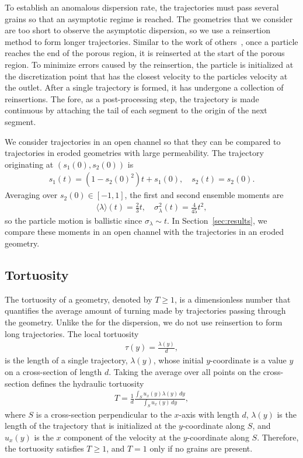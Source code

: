 \documentclass[preprint, 10pt]{elsarticle}
\begin{document}
To establish an anomalous dispersion rate, the trajectories must pass
several grains so that an asymptotic regime is reached. The geometries
that we consider are too short to observe the asymptotic dispersion, so
we use a reinsertion method to form longer trajectories. Similar to the
work of others~\cite{dea-qua-bir-jua2018, puy-gou-den2019}, once a
particle reaches the end of the porous region, it is reinserted at the
start of the porous region.  To minimize errors caused by the
reinsertion, the particle is initialized at the discretization point
that has the closest velocity to the particles velocity at the outlet.
After a single trajectory is formed, it has undergone a collection of
reinsertions.  The fore, as a post-processing step, the trajectory is made
continuous by attaching the tail of each segment to the origin of the
next segment.  

We consider trajectories in an open channel so that they can be compared
to trajectories in eroded geometries with large permeability.  The
trajectory originating at $(s_1(0),s_2(0))$ is
\begin{align}
  s_1(t) = (1-s_2(0)^2)t + s_1(0), \quad
  s_2(t) = s_2(0).
\end{align}
Averaging over $s_2(0) \in [-1,1]$, the first and second ensemble
moments are
\begin{align}
  \langle \lambda \rangle (t) = \frac{2}{3}t, \quad 
    \sigma_\lambda^2(t) = \frac{4}{45}t^2,
\end{align}
so the particle motion is ballistic since $\sigma_\lambda \sim t$.  In
Section~\ref{sec:results}, we compare these moments in an open channel
with the trajectories in an eroded geometry.


\subsection{Tortuosity}
The tortuosity of a geometry, denoted by $T \geq 1$, is a dimensionless
number that quantifies the average amount of turning made by
trajectories passing through the geometry.  Unlike the for the
dispersion, we do not use reinsertion to form long trajectories.  The
local tortuosity
\begin{align}
  \tau(y) = \frac{\lambda(y)}{d},
  \label{eqn:localTort}
\end{align}
is the length of a single trajectory, $\lambda(y)$, whose initial
$y$-coordinate is a value $y$ on a cross-section of length $d$.  Taking
the average over all points on the cross-section defines the hydraulic
tortuosity
\begin{align}
  T = \frac{1}{d}\frac{\displaystyle\int_{S}u_x(y)\lambda(y)\,dy}
  {\displaystyle\int_{S}u_x(y)\,dy},
  \label{eqn:tortuosity1}
\end{align}
where $S$ is a cross-section perpendicular to the $x$-axis with length
$d$, $\lambda(y)$ is the length of the trajectory that is initialized at
the $y$-coordinate along $S$, and $u_x(y)$ is the $x$ component of the
velocity at the $y$-coordinate along $S$.  Therefore, the tortuosity
satisfies $T \geq 1$, and $T=1$ only if no grains are present.  
\end{document}
